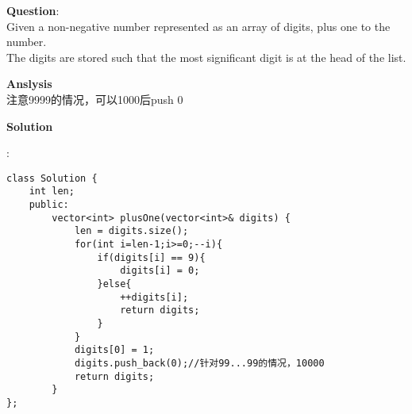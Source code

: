     
\begin{description}
    \item{\textbf{Question}}:\\%
	Given a non-negative number represented as an array of digits, plus one to the number.\\
	The digits are stored such that the most significant digit is at the head of the list.\\

    \item{\textbf{Anslysis}}\\
		注意9999的情况，可以1000后push 0\\

    \item{\textbf{Solution}}\\
	\item{} : \\
		\begin{lstlisting}
class Solution {
	int len;
	public:
		vector<int> plusOne(vector<int>& digits) {
			len = digits.size();
			for(int i=len-1;i>=0;--i){
				if(digits[i] == 9){
					digits[i] = 0;
				}else{
					++digits[i];
					return digits;
				}
			}
			digits[0] = 1;
			digits.push_back(0);//针对99...99的情况，10000
			return digits;
		}
};
		\end{lstlisting}

\end{description}

